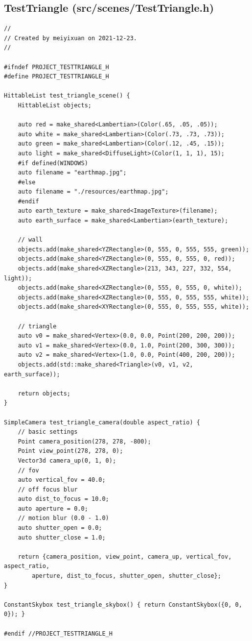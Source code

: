 \documentclass[utf8]{article}
\begin{document}
\subsection{TestTriangle (src/scenes/TestTriangle.h)}
\begin{lstlisting}[style=CStyle]
//
// Created by meiyixuan on 2021-12-23.
//

#ifndef PROJECT_TESTTRIANGLE_H
#define PROJECT_TESTTRIANGLE_H

HittableList test_triangle_scene() {
	HittableList objects;
	
	auto red = make_shared<Lambertian>(Color(.65, .05, .05));
	auto white = make_shared<Lambertian>(Color(.73, .73, .73));
	auto green = make_shared<Lambertian>(Color(.12, .45, .15));
	auto light = make_shared<DiffuseLight>(Color(1, 1, 1), 15);
	#if defined(WINDOWS)
	auto filename = "earthmap.jpg";
	#else
	auto filename = "./resources/earthmap.jpg";
	#endif
	auto earth_texture = make_shared<ImageTexture>(filename);
	auto earth_surface = make_shared<Lambertian>(earth_texture);
	
	// wall
	objects.add(make_shared<YZRectangle>(0, 555, 0, 555, 555, green));
	objects.add(make_shared<YZRectangle>(0, 555, 0, 555, 0, red));
	objects.add(make_shared<XZRectangle>(213, 343, 227, 332, 554, light));
	objects.add(make_shared<XZRectangle>(0, 555, 0, 555, 0, white));
	objects.add(make_shared<XZRectangle>(0, 555, 0, 555, 555, white));
	objects.add(make_shared<XYRectangle>(0, 555, 0, 555, 555, white));
	
	// triangle
	auto v0 = make_shared<Vertex>(0.0, 0.0, Point(200, 200, 200));
	auto v1 = make_shared<Vertex>(0.0, 1.0, Point(200, 300, 300));
	auto v2 = make_shared<Vertex>(1.0, 0.0, Point(400, 200, 200));
	objects.add(std::make_shared<Triangle>(v0, v1, v2, earth_surface));
	
	return objects;
}

SimpleCamera test_triangle_camera(double aspect_ratio) {
	// basic settings
	Point camera_position(278, 278, -800);
	Point view_point(278, 278, 0);
	Vector3d camera_up(0, 1, 0);
	// fov
	auto vertical_fov = 40.0;
	// off focus blur
	auto dist_to_focus = 10.0;
	auto aperture = 0.0;
	// motion blur (0.0 - 1.0)
	auto shutter_open = 0.0;
	auto shutter_close = 1.0;
	
	return {camera_position, view_point, camera_up, vertical_fov, aspect_ratio,
		aperture, dist_to_focus, shutter_open, shutter_close};
}

ConstantSkybox test_triangle_skybox() { return ConstantSkybox({0, 0, 0}); }

#endif //PROJECT_TESTTRIANGLE_H

\end{lstlisting}
\end{document}
